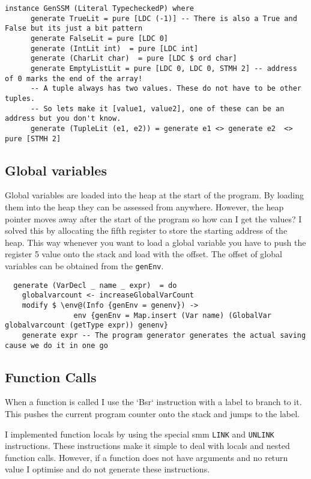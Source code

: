 \documentclass{report}
\begin{document}
\begin{verbatim}
instance GenSSM (Literal TypecheckedP) where
      generate TrueLit = pure [LDC (-1)] -- There is also a True and False but its just a bit pattern 
      generate FalseLit = pure [LDC 0]
      generate (IntLit int)  = pure [LDC int]
      generate (CharLit char)  = pure [LDC $ ord char]
      generate EmptyListLit = pure [LDC 0, LDC 0, STMH 2] -- address of 0 marks the end of the array!
      -- A tuple always has two values. These do not have to be other tuples. 
      -- So lets make it [value1, value2], one of these can be an address but you don't know.
      generate (TupleLit (e1, e2)) = generate e1 <> generate e2  <> pure [STMH 2]
    \end{verbatim}


\subsection{Global variables}

Global variables are loaded into the heap at the start of the program. By loading them into the heap they can be assessed from anywhere. However, the heap pointer moves away after the start of the program so how can I get the values? I solved this by allocating the fifth register to store the starting address of the heap. This way whenever you want to load a global variable you have to push the register 5 value onto the stack and load with the offset. The offset of global variables can be obtained from the \texttt{genEnv}.  

\begin{verbatim}
  generate (VarDecl _ name _ expr)  = do 
    globalvarcount <- increaseGlobalVarCount
    modify $ \env@(Info {genEnv = genenv}) -> 
                env {genEnv = Map.insert (Var name) (GlobalVar globalvarcount (getType expr)) genenv}
    generate expr -- The program generator generates the actual saving cause we do it in one go
\end{verbatim}

\subsection{Function Calls}

When a function is called I use the `Bsr` instruction with a label to branch to it. This pushes the current program counter onto the stack and jumps to the label.

I implemented function locals by using the special smm \texttt{LINK} and \texttt{UNLINK} instructions. These instructions make it simple to deal with locals and nested function calls. However, if a function does not have arguments and no return value I optimise and do not generate these instructions. 
\end{document}
